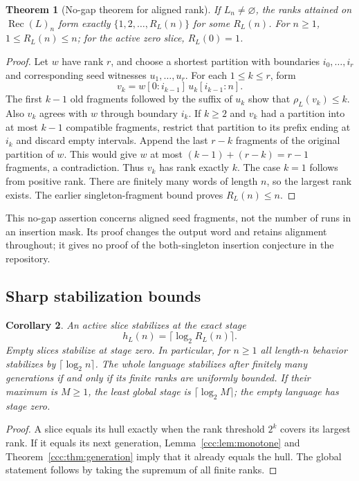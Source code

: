 \documentclass[11pt,letterpaper]{article}
\newtheorem{theorem}{Theorem}[section]
\newtheorem{corollary}[theorem]{Corollary}
\theoremstyle{definition}
\theoremstyle{remark}
\newcommand{\rec}{\operatorname{Rec}}
\newcommand{\rank}{\rho}
\begin{document}
\begin{theorem}[No-gap theorem for aligned rank]\label{ccc:thm:nogap}
If $L_n\ne\varnothing$, the ranks attained on $\rec(L)_n$ form exactly
$\{1,2,\ldots,R_L(n)\}$ for some $R_L(n)$. For $n\geq1$,
$1\leq R_L(n)\leq n$; for the active zero slice, $R_L(0)=1$.
\end{theorem}
\begin{proof}
Let $w$ have rank $r$, and choose a shortest partition with boundaries
$i_0,\ldots,i_r$ and corresponding seed witnesses $u_1,\ldots,u_r$.
For each $1\leq k\leq r$, form
\[
 v_k=w[0:i_{k-1}]\,u_k[i_{k-1}:n].
\]
The first $k-1$ old fragments followed by the suffix of $u_k$ show that
$\rank_L(v_k)\leq k$. Also $v_k$ agrees with $w$ through boundary $i_k$.
If $k\geq2$ and $v_k$ had a partition into at most $k-1$ compatible
fragments, restrict that partition to its prefix ending at $i_k$ and discard
empty intervals. Append the last $r-k$ fragments of the original partition
of $w$. This would give $w$ at most $(k-1)+(r-k)=r-1$ fragments, a
contradiction. Thus $v_k$ has rank exactly $k$. The case $k=1$ follows from
positive rank. There are finitely many words of length $n$, so the largest
rank exists. The earlier singleton-fragment bound proves $R_L(n)\leq n$.
\end{proof}

This no-gap assertion concerns aligned seed fragments, not the number of
runs in an insertion mask. Its proof changes the output word and retains
alignment throughout; it gives no proof of the both-singleton insertion
conjecture in the repository.

\subsection{Sharp stabilization bounds}

\begin{corollary}\label{ccc:cor:stages}
An active slice stabilizes at the exact stage
\[
 h_L(n)=\lceil\log_2 R_L(n)\rceil.
\]
Empty slices stabilize at stage zero. In particular, for $n\geq1$ all
length-$n$ behavior stabilizes by $\lceil\log_2 n\rceil$.
The whole language stabilizes after finitely many generations if and only if
its finite ranks are uniformly bounded. If their maximum is $M\geq1$, the
least global stage is $\lceil\log_2 M\rceil$; the empty language has stage zero.
\end{corollary}
\begin{proof}
A slice equals its hull exactly when the rank threshold $2^k$ covers its
largest rank. If it equals its next generation, Lemma~\ref{ccc:lem:monotone} and
Theorem~\ref{ccc:thm:generation} imply that it already equals the hull. The global
statement follows by taking the supremum of all finite ranks.
\end{proof}
\end{document}
